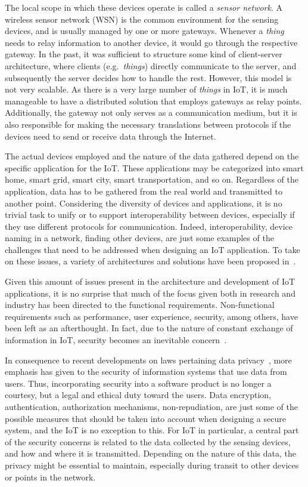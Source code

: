 \documentclass[12pt]{article}
\begin{document}
The local scope in which these devices operate is called a \emph{sensor network}. A wireless sensor network (WSN) is the common environment for the sensing devices, and is usually managed by one or more gateways. Whenever a \emph{thing} needs to relay information to another device, it would go through the respective gateway. In the past, it was sufficient to structure some kind of client-server architecture, where clients (e.g.\ \emph{things}) directly communicate to the server, and subsequently the server decides how to handle the rest. However, this model is not very scalable. As there is a very large number of \emph{things} in IoT, it is much manageable to have a distributed solution that employs gateways as relay points. Additionally, the gateway not only serves as a communication medium, but it is also responsible for making the necessary translations between protocols if the devices need to send or receive data through the Internet.

The actual devices employed and the nature of the data gathered depend on the specific application for the IoT. These applications may be categorized into smart home, smart grid, smart city, smart transportation, and so on. Regardless of the application, data has to be gathered from the real world and transmitted to another point. Considering the diversity of devices and applications, it is no trivial task to unify or to support interoperability between devices, especially if they use different protocols for communication. Indeed, interoperability, device naming in a network, finding other devices, are just some examples of the challenges that need to be addressed when designing an IoT application. To take on these issues, a variety of architectures and solutions have been proposed in~\cite{ALABA201710}. 

Given this amount of issues present in the architecture and development of IoT applications, it is no surprise that much of the focus given both in research and industry has been directed to the functional requirements. Non-functional requirements such as performance, user experience, security, among others, have been left as an afterthought. In fact, due to the nature of constant exchange of information in IoT, security becomes an inevitable concern~\cite{Zhang:2015}.

In consequence to recent developments on laws pertaining data privacy~\cite{eu_law}, more emphasis has given to the security of information systems that use data from users. Thus, incorporating security into a software product is no longer a courtesy, but a legal and ethical duty toward the users. Data encryption, authentication, authorization mechanisms, non-repudiation, are just some of the possible measures that should be taken into account when designing a secure system, and the IoT is no exception to this. For IoT in particular, a central part of the security concerns is related to the data collected by the sensing devices, and how and where it is transmitted. Depending on the nature of this data, the privacy might be essential to maintain, especially during transit to other devices or points in the network.
\end{document}
